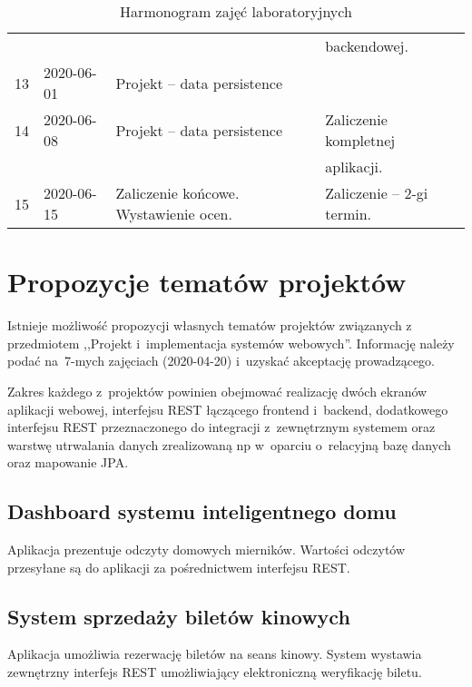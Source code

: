 \documentclass[12pt]{article}
\begin{document}
\begin{table}
\begin{tabular}{|r|l|l|l|}
                &           &                                           & backendowej.\\
            13  & 2020-06-01& Projekt -- data persistence               &\\
            14  & 2020-06-08& Projekt -- data persistence               & Zaliczenie kompletnej\\
                &           &                                           & aplikacji.\\
            15  & 2020-06-15& Zaliczenie końcowe. Wystawienie ocen.     & Zaliczenie -- 2-gi termin.\\
            \hline
        \end{tabular}
        \caption{Harmonogram zajęć laboratoryjnych}
        \label{harmonogram}
    \end{table}

    \section*{Propozycje tematów projektów}

        \noindent Istnieje możliwość  propozycji własnych tematów projektów związanych z przedmiotem ,,Projekt i~implementacja systemów webowych''. Informację należy podać na~7-mych zajęciach (2020-04-20) i~uzyskać akceptację prowadzącego.

        Zakres każdego z~projektów powinien obejmować realizację dwóch ekranów aplikacji webowej, interfejsu REST łączącego frontend i~backend, dodatkowego interfejsu REST przeznaczonego do integracji z~zewnętrznym systemem oraz warstwę utrwalania danych zrealizowaną np w~oparciu o~relacyjną bazę danych oraz mapowanie JPA.

        \subsection*{Dashboard systemu inteligentnego domu}
            Aplikacja prezentuje odczyty domowych mierników. Wartości odczytów przesyłane są do aplikacji za pośrednictwem interfejsu REST.

        \subsection*{System sprzedaży biletów kinowych}
            Aplikacja umożliwia rezerwację biletów na seans kinowy. System wystawia zewnętrzny interfejs REST umożliwiający elektroniczną weryfikację biletu.
\end{document}
